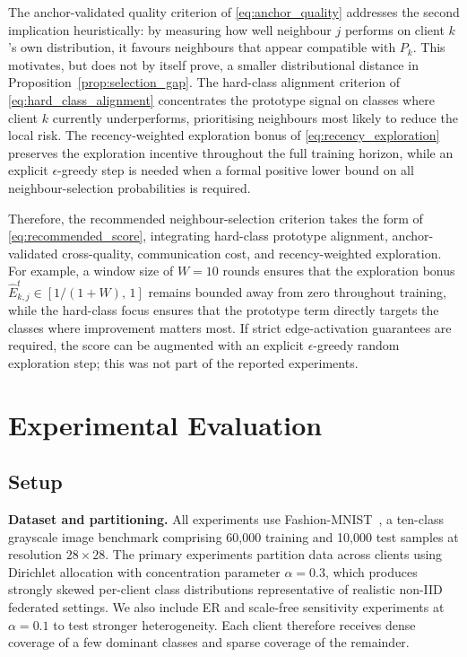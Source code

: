 \documentclass[conference]{IEEEtran}
\newcommand{\rev}[1]{#1}
\begin{document}
The anchor-validated quality criterion of \eqref{eq:anchor_quality} addresses the second implication \rev{heuristically}: by measuring how well neighbour \(j\) performs on client \(k\)'s own distribution, it favours neighbours that appear compatible with \(P_k\). \rev{This motivates, but does not by itself prove, a smaller distributional distance in Proposition~\ref{prop:selection_gap}.} The hard-class alignment criterion of \eqref{eq:hard_class_alignment} concentrates the prototype signal on classes where client \(k\) currently underperforms, prioritising neighbours most likely to reduce the local risk. The recency-weighted exploration bonus of \eqref{eq:recency_exploration} preserves the exploration incentive throughout the full training horizon, \rev{while an explicit \(\epsilon\)-greedy step is needed when a formal positive lower bound on all neighbour-selection probabilities is required.}

Therefore, the recommended neighbour-selection criterion takes the form of \eqref{eq:recommended_score}, integrating hard-class prototype alignment, anchor-validated cross-quality, communication cost, and recency-weighted exploration. For example, a window size of $W = 10$ rounds ensures that the exploration bonus \(\hat{E}_{k,j}^t \in [1/(1+W),\, 1]\) remains bounded away from zero throughout training, while the hard-class focus ensures that the prototype term directly targets the classes where improvement matters most. If strict edge-activation guarantees are required, the score can be augmented with an explicit $\epsilon$-greedy random exploration step; this was not part of the reported experiments.



\section{Experimental Evaluation}
\label{sec:experimental-evaluation}

\subsection{Setup}
\label{subsec:setup}

\textbf{Dataset and partitioning.}
All experiments use Fashion-MNIST~\cite{xiao2017fashion}, a ten-class grayscale image benchmark comprising 60{,}000 training and 10{,}000 test samples at resolution $28\times28$. The primary experiments partition data across clients using Dirichlet allocation with concentration parameter $\alpha=0.3$, which produces strongly skewed per-client class distributions representative of realistic non-IID federated settings. We also include ER and scale-free sensitivity experiments at $\alpha=0.1$ to test stronger heterogeneity. Each client therefore receives dense coverage of a few dominant classes and sparse coverage of the remainder.
\end{document}
